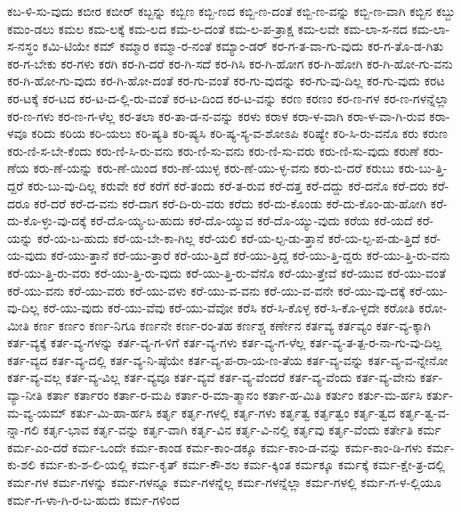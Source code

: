 {ಕಬ-ಳಿ-ಸು-ವುದು
ಕಬೀರ
ಕಬೀರ್
ಕಬ್ಬನ್ನು
ಕಬ್ಬಿಣ
ಕಬ್ಬಿ-ಣದ
ಕಬ್ಬಿ-ಣ-ದಂತೆ
ಕಬ್ಬಿ-ಣ-ವನ್ನು
ಕಬ್ಬಿ-ಣ-ವಾಗಿ
ಕಬ್ಬಿನ
ಕಬ್ಬು
ಕಮಂ-ಡಲು
ಕಮಲ
ಕಮ-ಲಕ್ಕೆ
ಕಮ-ಲದ
ಕಮ-ಲ-ದಂತೆ
ಕಮ-ಲ-ಪ-ತ್ರಾಕ್ಷ
ಕಮ-ಲವೇ
ಕಮ-ಲಾ-ಸ-ನದ
ಕಮ-ಲಾ-ಸ-ನಸ್ಥಂ
ಕಮಿ-ಟಿಯೇ
ಕಮ್
ಕಮ್ಮಾರ
ಕಮ್ಮಾ-ರ-ನಂತೆ
ಕಮ್ಯಾಂ-ಡರ್
ಕರ-ಗ-ತ-ವಾ-ಗು-ವುದು
ಕರ-ಗ-ತೊ-ಡ-ಗಿತು
ಕರ-ಗ-ಬೇಕು
ಕರ-ಗಳು
ಕರಗಿ
ಕರ-ಗಿ-ದರೆ
ಕರ-ಗಿ-ಸದೆ
ಕರ-ಗಿಸಿ
ಕರ-ಗಿ-ಹೋಗ
ಕರ-ಗಿ-ಹೋಗಿ
ಕರ-ಗಿ-ಹೋ-ಗು-ವನು
ಕರ-ಗಿ-ಹೋ-ಗು-ವುದು
ಕರ-ಗಿ-ಹೋ-ದಂತೆ
ಕರ-ಗು-ವಂತೆ
ಕರ-ಗು-ವುದನ್ನು
ಕರ-ಗು-ವು-ದಿಲ್ಲ
ಕರ-ಗು-ವುದು
ಕರಟ
ಕರ-ಟಕ್ಕೆ
ಕರ-ಟದ
ಕರ-ಟ-ದ-ಲ್ಲಿ-ರು-ವಂತೆ
ಕರ-ಟ-ದಿಂದ
ಕರ-ಟ-ವನ್ನು
ಕರಣ
ಕರಣಂ
ಕರ-ಣ-ಗಳ
ಕರ-ಣ-ಗಳನ್ನೆಲ್ಲಾ
ಕರ-ಣ-ಗಳು
ಕರ-ಣ-ಗ-ಳೆಲ್ಲ
ಕರ-ತಲಾ
ಕರ-ತಾ-ಡ-ನ-ವನ್ನು
ಕರಳು
ಕರಾಳ
ಕರಾ-ಳ-ವಾಗಿ
ಕರಾ-ಳ-ವಾ-ಗಿ-ರುವ
ಕರಾ-ಳವೂ
ಕರಿದು
ಕರಿಯ
ಕರಿ-ಯಲು
ಕರಿ-ಷ್ಯತಿ
ಕರಿ-ಷ್ಯಸಿ
ಕರಿ-ಷ್ಯ-ಸ್ಯ-ವ-ಶೋಽಪಿ
ಕರಿಷ್ಯೇ
ಕರಿ-ಸಿ-ರು-ವನೊ
ಕರು
ಕರುಣ
ಕರು-ಣಿ-ಸ-ಬೇ-ಕೆಂದು
ಕರು-ಣಿ-ಸಿ-ರು-ವನು
ಕರು-ಣಿ-ಸು-ವನು
ಕರು-ಣಿ-ಸು-ವರು
ಕರು-ಣಿ-ಸು-ವುದು
ಕರುಣೆ
ಕರು-ಣೆಯ
ಕರು-ಣೆ-ಯನ್ನು
ಕರು-ಣೆ-ಯಿಂದ
ಕರು-ಣೆ-ಯುಳ್ಳ
ಕರು-ಣೆ-ಯು-ಳ್ಳ-ವನು
ಕರು-ಬಿ-ದರೆ
ಕರುಬು
ಕರು-ಬು-ತ್ತಿ-ದ್ದರೆ
ಕರು-ಬು-ವು-ದಿಲ್ಲ
ಕರುವೇ
ಕರೆ
ಕರೆಗೆ
ಕರೆ-ತಂದು
ಕರೆ-ತ-ರುವ
ಕರೆ-ದತ್ತ
ಕರೆ-ದದ್ದು
ಕರೆ-ದನೊ
ಕರೆ-ದರು
ಕರೆ-ದರೂ
ಕರೆ-ದರೆ
ಕರೆ-ದ-ವನು
ಕರೆ-ದಾಗ
ಕರೆ-ದಿ-ರು-ವರು
ಕರೆದು
ಕರೆ-ದು-ಕೊಂಡು
ಕರೆ-ದು-ಕೊಂ-ಡು-ಹೋಗಿ
ಕರೆ-ದು-ಕೊ-ಳ್ಳು-ವು-ದಕ್ಕೆ
ಕರೆ-ದೊ-ಯ್ಯ-ಬ-ಹುದು
ಕರೆ-ದೊ-ಯ್ಯುವ
ಕರೆ-ದೊ-ಯ್ಯು-ವುದು
ಕರೆಯ
ಕರೆ-ಯದೆ
ಕರೆ-ಯನ್ನು
ಕರೆ-ಯ-ಬ-ಹುದು
ಕರೆ-ಯ-ಬೇ-ಕಾ-ಗಿಲ್ಲ
ಕರೆ-ಯಲಿ
ಕರೆ-ಯ-ಲ್ಪ-ಡು-ತ್ತಾನೆ
ಕರೆ-ಯ-ಲ್ಪ-ಪ-ಡು-ತ್ತಿದೆ
ಕರೆ-ಯ-ವುದು
ಕರೆ-ಯು-ತ್ತಾನೆ
ಕರೆ-ಯು-ತ್ತಾರೆ
ಕರೆ-ಯು-ತ್ತಿದೆ
ಕರೆ-ಯು-ತ್ತಿದ್ದ
ಕರೆ-ಯು-ತ್ತಿ-ದ್ದರು
ಕರೆ-ಯು-ತ್ತಿ-ರು-ವನು
ಕರೆ-ಯು-ತ್ತಿ-ರು-ವರು
ಕರೆ-ಯು-ತ್ತಿ-ರು-ವುದು
ಕರೆ-ಯು-ತ್ತಿ-ರು-ವೆನೊ
ಕರೆ-ಯು-ತ್ತೇವೆ
ಕರೆ-ಯುವ
ಕರೆ-ಯು-ವಂತೆ
ಕರೆ-ಯು-ವನು
ಕರೆ-ಯು-ವರು
ಕರೆ-ಯು-ವಳು
ಕರೆ-ಯು-ವ-ವನು
ಕರೆ-ಯು-ವ-ವನೇ
ಕರೆ-ಯು-ವು-ದಕ್ಕೆ
ಕರೆ-ಯು-ವು-ದಿಲ್ಲ
ಕರೆ-ಯು-ವುದು
ಕರೆ-ಯು-ವೆವು
ಕರೆ-ಯು-ವೆವೋ
ಕರೆಸಿ
ಕರೆ-ಸಿ-ಕೊಳ್ಳ
ಕರೆ-ಸಿ-ಕೊ-ಳ್ಳದೇ
ಕರೋತಿ
ಕರೋ-ಮೀತಿ
ಕರ್ಣ
ಕರ್ಣಂ
ಕರ್ಣ-ನಿಗೂ
ಕರ್ಣನೇ
ಕರ್ಣ-ರಂ-ತಹ
ಕರ್ಣಶ್ಚ
ಕರ್ಣೇನ
ಕರ್ತವ್ಯ
ಕರ್ತವ್ಯಂ
ಕರ್ತ-ವ್ಯ-ಕ್ಕಾಗಿ
ಕರ್ತ-ವ್ಯಕ್ಕೆ
ಕರ್ತ-ವ್ಯ-ಗಳನ್ನು
ಕರ್ತ-ವ್ಯ-ಗ-ಳಿಗೆ
ಕರ್ತ-ವ್ಯ-ಗಳು
ಕರ್ತ-ವ್ಯ-ಗ-ಳೆಲ್ಲ
ಕರ್ತ-ವ್ಯ-ತ-ತ್ಪ-ರ-ನಾ-ಗು-ವು-ದಿಲ್ಲ
ಕರ್ತ-ವ್ಯದ
ಕರ್ತ-ವ್ಯ-ದಲ್ಲಿ
ಕರ್ತ-ವ್ಯ-ನಿ-ಷ್ಠೆಯೇ
ಕರ್ತ-ವ್ಯ-ಪ-ರಾ-ಯ-ಣ-ತೆಯ
ಕರ್ತ-ವ್ಯ-ವನ್ನು
ಕರ್ತ-ವ್ಯ-ವ-ನ್ನೇನೋ
ಕರ್ತ-ವ್ಯ-ವಲ್ಲ
ಕರ್ತ-ವ್ಯ-ವಿಲ್ಲ
ಕರ್ತ-ವ್ಯವೂ
ಕರ್ತ-ವ್ಯವೆ
ಕರ್ತ-ವ್ಯ-ವೆಂದರೆ
ಕರ್ತ-ವ್ಯ-ವೆಂದು
ಕರ್ತ-ವ್ಯ-ವೇನು
ಕರ್ತ-ವ್ಯಾ-ನೀತಿ
ಕರ್ತಾ
ಕರ್ತಾರಂ
ಕರ್ತಾ-ರ-ಮಪಿ
ಕರ್ತಾ-ರ-ಮಾ-ತ್ಮಾನಂ
ಕರ್ತಾ-ಹ-ಮಿತಿ
ಕರ್ತುಂ
ಕರ್ತು-ಮ-ರ್ಹಸಿ
ಕರ್ತು-ಮ-ವ್ಯ-ಯಮ್
ಕರ್ತು-ಮಿ-ಹಾ-ರ್ಹಸಿ
ಕರ್ತೃ
ಕರ್ತೃ-ಗಳಲ್ಲಿ
ಕರ್ತೃ-ಗಳು
ಕರ್ತೃತ್ವ
ಕರ್ತೃತ್ವಂ
ಕರ್ತೃ-ತ್ವದ
ಕರ್ತೃ-ತ್ವ-ವ-ನ್ನಾ-ಗಲಿ
ಕರ್ತೃ-ಭಾವ
ಕರ್ತೃ-ವನ್ನು
ಕರ್ತೃ-ವಾಗಿ
ಕರ್ತೃ-ವಿನ
ಕರ್ತೃ-ವಿ-ನಲ್ಲಿ
ಕರ್ತೃವು
ಕರ್ತೃ-ವೆಂದು
ಕರ್ತೇತಿ
ಕರ್ಮ
ಕರ್ಮ-ಎಂ-ದರೆ
ಕರ್ಮ-ಒಂದೇ
ಕರ್ಮ-ಕಾಂಡ
ಕರ್ಮ-ಕಾಂ-ಡಕ್ಕೂ
ಕರ್ಮ-ಕಾಂ-ಡ-ವನ್ನು
ಕರ್ಮ-ಕಾಂ-ಡಿ-ಗಳು
ಕರ್ಮ-ಕು-ಶಲಿ
ಕರ್ಮ-ಕು-ಶ-ಲಿ-ಯಲ್ಲಿ
ಕರ್ಮ-ಕೃತ್
ಕರ್ಮ-ಕೌ-ಶಲ
ಕರ್ಮ-ಕ್ಕಿಂತ
ಕರ್ಮಕ್ಕೂ
ಕರ್ಮಕ್ಕೆ
ಕರ್ಮ-ಕ್ಷೇ-ತ್ರ-ದಲ್ಲಿ
ಕರ್ಮ-ಗಳ
ಕರ್ಮ-ಗಳನ್ನು
ಕರ್ಮ-ಗಳನ್ನೂ
ಕರ್ಮ-ಗಳನ್ನೆಲ್ಲ
ಕರ್ಮ-ಗಳನ್ನೆಲ್ಲಾ
ಕರ್ಮ-ಗಳಲ್ಲಿ
ಕರ್ಮ-ಗ-ಳ-ಲ್ಲಿಯೂ
ಕರ್ಮ-ಗ-ಳಾ-ಗಿ-ರ-ಬ-ಹುದು
ಕರ್ಮ-ಗಳಿಂದ
}
